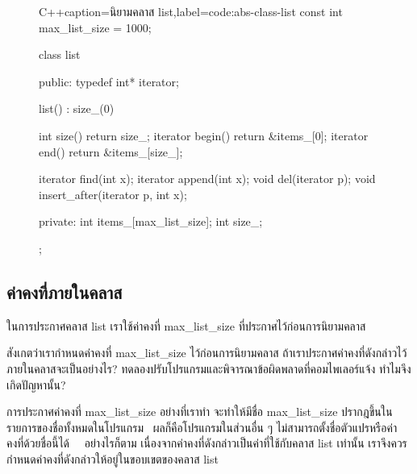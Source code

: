 \begin{figure}
\latintext
\begin{codelist}{C++}{caption={\thaitext นิยาม{\wbr}ค{\wbr}ลา{\wbr}ส {\ct list}\latintext},label=code:abs-class-list}
const int max_list_size = 1000;

class list {
public:
  typedef int* iterator;

  list() : size_(0) {}

  int size() { return size_; }
  iterator begin() { return &items_[0]; }
  iterator end() { return &items_[size_]; }

  iterator find(int x);
  iterator append(int x);
  void del(iterator p);
  void insert_after(iterator p, int x);

private:
  int items_[max_list_size];
  int size_;
};
\end{codelist}
\thaitext
\end{figure}

\subsection{ค่าคงที่{\wbr}ภายใน{\wbr}ค{\wbr}ลา{\wbr}ส}

ใน{\wbr}การ{\wbr}ประกาศ{\wbr}ค{\wbr}ลา{\wbr}ส {\ct list} เรา{\wbr}ใช้{\wbr}ค่าคงที่ {\ct max\_list\_size}
ที่{\wbr}ประกาศ{\wbr}ไว้{\wbr}ก่อน{\wbr}การ{\wbr}นิยาม{\wbr}ค{\wbr}ลา{\wbr}ส

\begin{quiz}{}
\label{quiz:abs-const-member-error}
สังเกต{\wbr}ว่า{\wbr}เรา{\wbr}กำหนด{\wbr}ค่าคงที่ {\ct max\_list\_size} ไว้{\wbr}ก่อน{\wbr}การ{\wbr}นิยาม{\wbr}ค{\wbr}ลา{\wbr}ส
ถ้า{\wbr}เรา{\wbr}ประกาศ{\wbr}ค่าคงที่{\wbr}ดังกล่าว{\wbr}ไว้{\wbr}ภายใน{\wbr}ค{\wbr}ลา{\wbr}ส{\wbr}จะ{\wbr}เป็น{\wbr}อย่างไร?
ทดลอง{\wbr}ปรับ{\wbr}โปรแกรม{\wbr}และ{\wbr}พิจารณา{\wbr}ข้อผิดพลาด{\wbr}ที่{\wbr}คอม{\wbr}ไพ{\wbr}เลอร์{\wbr}แจ้ง ทำไม{\wbr}จึง{\wbr}เกิด{\wbr}ปัญหา{\wbr}นั้น?
\end{quiz}

การ{\wbr}ประกาศ{\wbr}ค่าคงที่ {\ct max\_list\_size } อย่าง{\wbr}ที่{\wbr}เรา{\wbr}ทำ จะ{\wbr}ทำ{\wbr}ให้{\wbr}มี{\wbr}ชื่อ {\ct
  max\_list\_size } ป{\wbr}รา{\wbr}กฎ{\wbr}ขึ้น{\wbr}ใน{\wbr}รายการ{\wbr}ของ{\wbr}ชื่อ{\wbr}ทั้งหมด{\wbr}ใน{\wbr}โปรแกรม{\wbr}
\ ผล{\wbr}ก็{\wbr}คือ{\wbr}โปรแกรม{\wbr}ใน{\wbr}ส่วน{\wbr}อื่น ๆ ไม่{\wbr}สามารถ{\wbr}ตั้ง{\wbr}ชื่อ{\wbr}ตัวแปร{\wbr}หรือ{\wbr}ค่าคงที่{\wbr}ด้วย{\wbr}ชื่อ{\wbr}นี้{\wbr}ได้{\wbr}
\ \ อย่างไรก็ตาม เนื่องจาก{\wbr}ค่าคงที่{\wbr}ดังกล่าว{\wbr}เป็น{\wbr}ค่า{\wbr}ที่{\wbr}ใช้{\wbr}กับ{\wbr}ค{\wbr}ลา{\wbr}ส {\ct list} เท่านั้น{\wbr}
เรา{\wbr}จึง{\wbr}ควร{\wbr}กำหนด{\wbr}ค่าคงที่{\wbr}ดังกล่าว{\wbr}ให้{\wbr}อยู่{\wbr}ใน{\wbr}ขอบเขต{\wbr}ของ{\wbr}ค{\wbr}ลา{\wbr}ส {\ct list}

